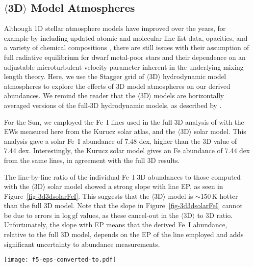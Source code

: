 \documentclass[revtex4]{emulateapj}
\begin{document}
\subsection{$\langle$3D$\rangle$ Model Atmospheres \label{sec:3Dmodels}}
Although 1D stellar atmosphere models have improved over the years, for example by including updated atomic and molecular line list data, opacities, and a variety of chemical compositions \citep[e.g.][]{Kurucz,Gust2008}, there are still issues with their assumption of full radiative equilibrium for dwarf metal-poor stars \citep{Magic2013} and their dependence on an adjustable microturbulent velocity parameter inherent in the underlying mixing-length 
theory.  Here, we use the Stagger grid of $\langle$3D$\rangle$ hydrodynamic model atmospheres \citep{Magic2013} to explore the effects of 3D model atmospheres on our derived abundances.  We remind the reader that the $\langle$3D$\rangle$ models are horizontally averaged versions of the full-3D hydrodynamic models, as described by \citep{Magic2013}. 

For the Sun, we employed the Fe~I lines used in the full 3D analysis of \citet{Asplund2000} with the EWs measured here from the Kurucz solar atlas, and the \citet{Magic2013} $\langle$3D$\rangle$ solar model.  This analysis gave a solar Fe~I abundance of 7.48 dex, higher than the 3D \citet{Asplund2000} value of 7.44 dex.  Interestingly, the Kurucz solar model gives an Fe abundance of 7.44 dex from the same lines, in agreement with the full 3D results.

The line-by-line ratio of the individual \citet{Asplund2000} Fe~I 3D abundances to those computed with the \citet{Magic2013} $\langle$3D$\rangle$ solar model showed a strong slope with line EP, as seen in Figure~\ref{fig-3d3dsolarFeI}.  This suggests that the $\langle$3D$\rangle$ model is $\sim$150\,K hotter than the full 3D model.  Note that the slope in Figure~\ref{fig-3d3dsolarFeI} cannot be due to errors in log\,gf values, as these cancel-out in the $\langle$3D$\rangle$ to 3D ratio. Unfortunately, the slope with EP means that the derived Fe~I abundance, relative to the full 3D model, depends on the EP of the line employed and adds significant uncertainty to abundance measurements.

\begin{figure*}[t]
\centering
\texttt{[image: f5-eps-converted-to.pdf]}
\caption{A plot showing the difference between Fe~I abundances computed here using the solar $\langle$3D$\rangle$ model from \citet{Magic2013} and the full 3D hydrodynamic model of \citet{Asplund2000}.  The difference slope is independent of log\,gf value of the lines, and suggests that the $\langle$3D$\rangle$ model is 150K hotter than the full 3D model.  
\label{fig-3d3dsolarFeI}}
\vspace{0.25cm}
\end{figure*}
\end{document}
